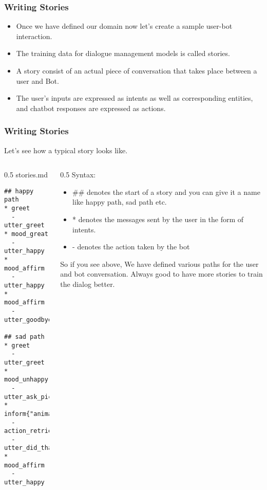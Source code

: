  \begin{frame}[fragile]\frametitle{Writing Stories}

\begin{itemize}
\item Once we have defined our domain now let’s create a sample user-bot interaction.
\item The training data for dialogue management models is called stories. 
\item A story consist of an actual piece of conversation that takes place between a user and Bot. 
\item The user’s inputs are expressed as intents as well as corresponding entities, and chatbot responses are expressed as actions.
\end{itemize}
\end{frame}

 \begin{frame}[fragile]\frametitle{Writing Stories}
 Let’s see how a typical story looks like.
 
 
    \begin{columns}
    \begin{column}[t]{0.5\linewidth}
	 stories.md

\begin{lstlisting}
## happy path               
* greet              
  - utter_greet
* mood_great              
  - utter_happy
* mood_affirm
  - utter_happy
* mood_affirm
  - utter_goodbye
  
## sad path          
* greet
  - utter_greet             
* mood_unhappy
  - utter_ask_picture
* inform{"animal":"dog"}  
  - action_retrieve_image
  - utter_did_that_help
* mood_affirm
  - utter_happy
\end{lstlisting}
    \end{column}
    \begin{column}[t]{0.5\linewidth}
	Syntax:
\begin{itemize}
\item \#\# denotes the start of a story and you can give it a name like happy path, sad path etc.
\item * denotes the messages sent by the user in the form of intents.
\item - denotes the action taken by the bot
\end{itemize}

So if you see above, We have defined various paths for the user and bot conversation. Always good to have more stories to train the dialog better.

    \end{column}
  \end{columns}
\end{frame}


